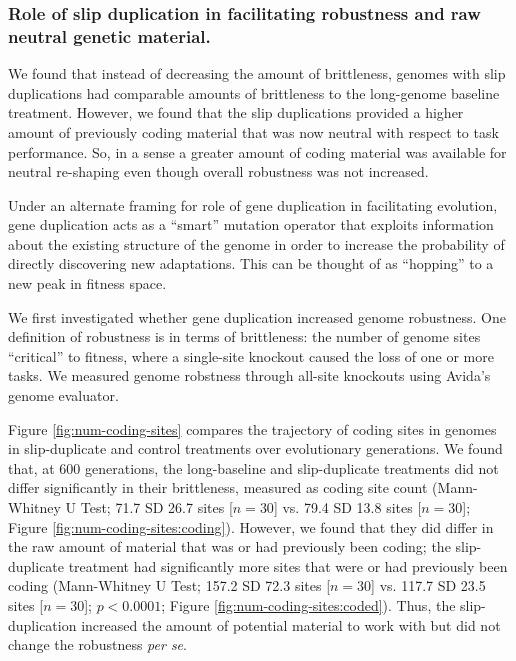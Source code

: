 \subsubsection{Role of slip duplication in facilitating robustness and raw neutral genetic material.}

We found that instead of decreasing the amount of brittleness, genomes with slip duplications had comparable amounts of brittleness to the long-genome baseline treatment.
However, we found that the slip duplications provided a higher amount of previously coding material that was now neutral with respect to task performance.
So, in a sense a greater amount of coding material was available for neutral re-shaping even though overall robustness was not increased.

Under an alternate framing for role of gene duplication in facilitating evolution, gene duplication acts as a ``smart'' mutation operator that exploits information about the existing structure of the genome in order to increase the probability of directly discovering new adaptations.
This can be thought of as ``hopping'' to a new peak in fitness space.

We first investigated whether gene duplication increased genome robustness.
One definition of robustness is in terms of brittleness: the number of genome sites ``critical'' to fitness, where a single-site knockout caused the loss of one or more tasks.
We measured genome robstness through all-site knockouts using Avida's genome evaluator.



Figure \ref{fig:num-coding-sites} compares the trajectory of coding sites in genomes in slip-duplicate and control treatments over evolutionary generations.
We found that, at 600 generations, the long-baseline and slip-duplicate treatments did not differ significantly in their brittleness, measured as coding site count (Mann-Whitney U Test; 71.7 SD 26.7 sites [$n=30$] vs. 79.4 SD 13.8 sites [$n=30$]; Figure \ref{fig:num-coding-sites:coding}).
However, we found that they did differ in the raw amount of material that was or had previously been coding; the slip-duplicate treatment had significantly more sites that were or had previously been coding (Mann-Whitney U Test; 157.2 SD 72.3 sites [$n=30$] vs. 117.7 SD 23.5 sites [$n=30$]; $p < 0.0001$; Figure \ref{fig:num-coding-sites:coded}).
Thus, the slip-duplication increased the amount of potential material to work with but did not change the robustness \textit{per se}.

